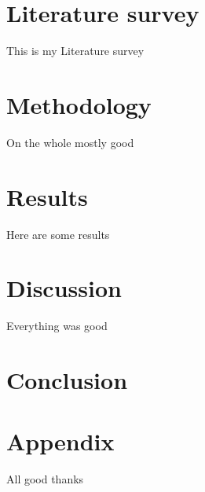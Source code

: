 \documentclass[12pt,a4paper]{article}
\begin{document}
\section{Literature survey}

This is my Literature survey

\section{Methodology}

On the whole mostly good 

\section{Results}

Here are some results 

\section{Discussion}

Everything was good

\section{Conclusion}



\section{Appendix}

All good thanks
\end{document}

